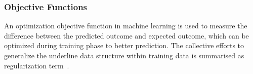 \subsubsection{Objective Functions}
An optimization objective function in machine learning is used to measure the difference between the predicted outcome and expected outcome, which can be optimized during training phase to better prediction. The collective efforts to generalize the underline data structure within training data is summarised as regularization term~\cite{goodfellow_2015}.  